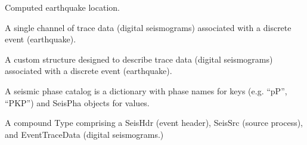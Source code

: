 \documentclass[letterpaper,11pt,english]{sphinxmanual}
\begin{document}
Computed earthquake location.

\begin{fulllineitems}
\label{\detokenize{src/Submodules/quake:EventChannel}}
\end{fulllineitems}


A single channel of trace data (digital seismograms) associated with a
discrete event (earthquake).

\begin{fulllineitems}
\label{\detokenize{src/Submodules/quake:EventTraceData}}
\end{fulllineitems}


A custom structure designed to describe trace data (digital seismograms)
associated with a discrete event (earthquake).

\begin{fulllineitems}
\label{\detokenize{src/Submodules/quake:PhaseCat}}
\end{fulllineitems}


A seismic phase catalog is a dictionary with phase names for keys (e.g. “pP”, “PKP”)
and SeisPha objects for values.

\begin{fulllineitems}
\label{\detokenize{src/Submodules/quake:SeisEvent}}
\end{fulllineitems}


A compound Type comprising a SeisHdr (event header), SeisSrc (source process),
and EventTraceData (digital seismograms.)

\begin{fulllineitems}
\label{\detokenize{src/Submodules/quake:SeisHdr}}
\end{fulllineitems}
\end{document}
